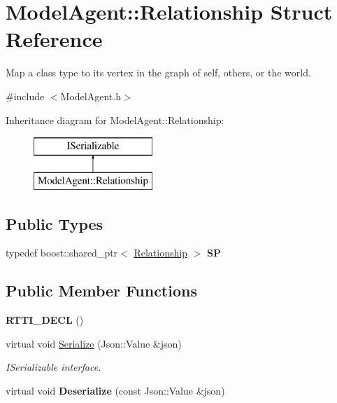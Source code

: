 \hypertarget{struct_model_agent_1_1_relationship}{}\section{Model\+Agent\+:\+:Relationship Struct Reference}
\label{struct_model_agent_1_1_relationship}


Map a class type to its vertex in the graph of self, others, or the world.  




{\ttfamily \#include $<$Model\+Agent.\+h$>$}

Inheritance diagram for Model\+Agent\+:\+:Relationship\+:\begin{figure}[H]
\begin{center}
\leavevmode
\includegraphics[height=2.000000cm]{struct_model_agent_1_1_relationship}
\end{center}
\end{figure}
\subsection*{Public Types}
\begin{DoxyCompactItemize}
\item 
\mbox{\label{struct_model_agent_1_1_relationship_a3682280919cce04ac0549675f0d99429}} 
typedef boost\+::shared\+\_\+ptr$<$ \hyperlink{struct_model_agent_1_1_relationship}{Relationship} $>$ {\bfseries SP}
\end{DoxyCompactItemize}
\subsection*{Public Member Functions}
\begin{DoxyCompactItemize}
\item 
\mbox{\label{struct_model_agent_1_1_relationship_abc3f69fb3a514968b77a63fcbc59c18a}} 
{\bfseries R\+T\+T\+I\+\_\+\+D\+E\+CL} ()
\item 
\mbox{\label{struct_model_agent_1_1_relationship_a42004dc0c651db79c492f99e6b71d94d}} 
virtual void \hyperlink{struct_model_agent_1_1_relationship_a42004dc0c651db79c492f99e6b71d94d}{Serialize} (Json\+::\+Value \&json)
\begin{DoxyCompactList}\small\item\em I\+Serializable interface. \end{DoxyCompactList}\item 
\mbox{\label{struct_model_agent_1_1_relationship_ab582470770a2e9abb7fad67fd324e61a}} 
virtual void {\bfseries Deserialize} (const Json\+::\+Value \&json)
\end{DoxyCompactItemize}
